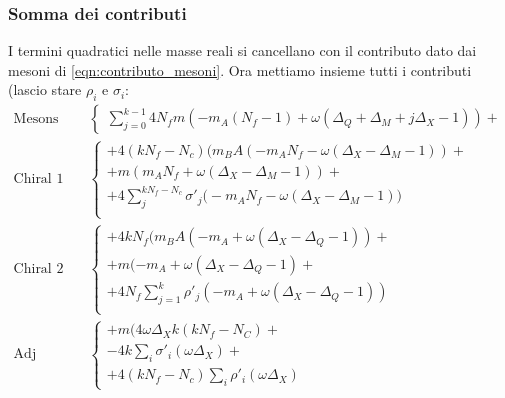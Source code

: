 \documentclass[a4paper,12pt]{article}
\begin{document}
\subsubsection{Somma dei contributi}


I termini quadratici nelle masse reali si cancellano con il contributo dato dai mesoni di \ref{eqn:contributo_mesoni}.
Ora mettiamo insieme tutti i contributi (lascio stare $\rho_i$ e $\sigma_i$:
\begin{align*}
\mbox{Mesons}  &\begin{cases}
\sum_{j=0}^{k-1} 4 N_f   m (- m_A (N_f - 1)  + \omega( \Delta_Q +  \Delta_M + j \Delta_X -1  )  ) +
\end{cases}
\\
\mbox{Chiral 1}& \begin{cases}
+  4 ( k N_f - N_c ) \big(  m_B A (  -  m_A N_f - \omega( \Delta_X - \Delta_M - 1)) +\\
 +  m ( m_A N_f + \omega( \Delta_X - \Delta_M - 1)) + \\
   +  4 \sum_j^{k N_f - N_c} \sigma'_j \big( - m_A N_f -  \omega( \Delta_X - \Delta_M - 1) \big) \\
\end{cases}\\
\mbox{Chiral 2} & \begin{cases}
  +    4 k N_f \big(  m_B A (- m_A +  \omega ( \Delta_X - \Delta_Q - 1)) + \\
  +  m ( - m_A +  \omega ( \Delta_X - \Delta_Q - 1)+ \\
+  4 N_f \sum_{j=1}^k  \rho'_j ( - m_A +  \omega ( \Delta_X - \Delta_Q - 1) ) \\
\end{cases}\\
\mbox{Adj matter} & \begin{cases}
	+ m( 4 \omega \Delta_X k ( k N_f - N_C) +\\
	- 4 k \sum_i \sigma'_i (  \omega \Delta_X ) + \\
	+ 4 (k N_f - N_c)  \sum_i \rho'_i(  \omega \Delta_X )
\end{cases}
\end{align*}
\end{document}
